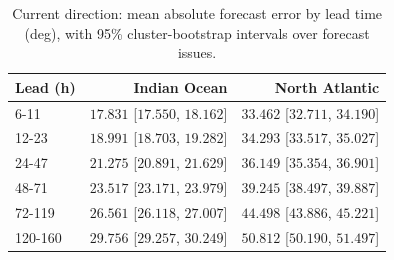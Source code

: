 \documentclass[review,authoryear]{elsarticle}
\begin{document}
\begin{table}[H]
\centering
\caption{Current direction: mean absolute forecast error by lead time (deg), with 95\%
cluster-bootstrap intervals over forecast issues.}
\label{tab:fe-ocean-current-direction-deg}
\begin{tabular}{lrr}
\toprule
Lead (h) & Indian Ocean & North Atlantic \\
\midrule
6-11 & $17.831$ [$17.550$, $18.162$] & $33.462$ [$32.711$, $34.190$] \\
12-23 & $18.991$ [$18.703$, $19.282$] & $34.293$ [$33.517$, $35.027$] \\
24-47 & $21.275$ [$20.891$, $21.629$] & $36.149$ [$35.354$, $36.901$] \\
48-71 & $23.517$ [$23.171$, $23.979$] & $39.245$ [$38.497$, $39.887$] \\
72-119 & $26.561$ [$26.118$, $27.007$] & $44.498$ [$43.886$, $45.221$] \\
120-160 & $29.756$ [$29.257$, $30.249$] & $50.812$ [$50.190$, $51.497$] \\
\bottomrule
\end{tabular}
\end{table}


\end{document}
